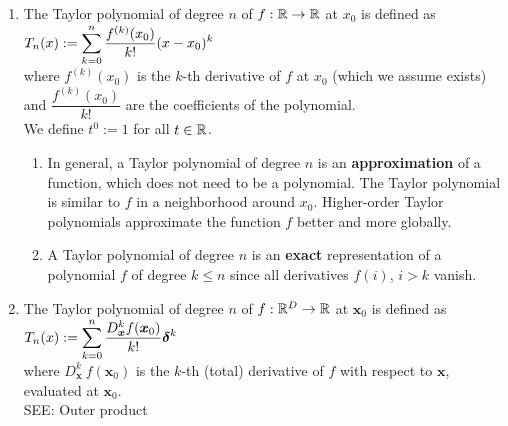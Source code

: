 \begin{enumerate}
    \item 
    \begin{definition}
        The Taylor polynomial of degree $n$ of $f : \mathbb{R} \to \mathbb{R}$ at $x_0$ is defined as
        $
            T_n(x)
            := \displaystyle\sum_{k=0}^n \dfrac{f^{(k)}(x_0)}{k!} (x - x_0)^k
        $
        \hfill \cite{mfml/book/mml/Deisenroth-Faisal-Ong}
        \\
        where $f ^{(k)}(x_0)$ is the $k$-th derivative of $f$ at $x_0$ (which we assume exists) and $\dfrac{f ^{(k)}(x_0)}{ k!}$ are the coefficients of the polynomial.
        \hfill \cite{mfml/book/mml/Deisenroth-Faisal-Ong}
        \\
        We define $t^0 := 1$ for all $t \in \mathbb{R}$.
        \hfill \cite{mfml/book/mml/Deisenroth-Faisal-Ong}
    \end{definition}
    \begin{enumerate}
        \item In general, a Taylor polynomial of degree $n$ is an \textbf{approximation} of a function, which does not need to be a polynomial. 
        The Taylor polynomial is similar to $f$ in a neighborhood around $x_0$. 
        Higher-order Taylor polynomials approximate the function $f$ better and more globally.
        \hfill \cite{mfml/book/mml/Deisenroth-Faisal-Ong}
        
        \item A Taylor polynomial of degree $n$ is an \textbf{exact} representation of a polynomial $f$ of degree $k \leq n$ since all derivatives $f (i)$, $i > k$ vanish. 
        \hfill \cite{mfml/book/mml/Deisenroth-Faisal-Ong}
    \end{enumerate}

    \item 
    \begin{definition}
        The Taylor polynomial of degree $n$ of $f : \mathbb{R}^D \to \mathbb{R}$ at $\bm{x}_0$ is defined as
        $
            T_n(x)
            := \displaystyle\sum_{k=0}^n \dfrac{D^k_{\bm{x}} f(\bm{x}_0)}{k!} \bm{\delta}^k
        $
        \hfill \cite{mfml/book/mml/Deisenroth-Faisal-Ong}
        \\
        where $D^k _{\bm{x}}\ f (\bm{x}_0)$ is the $k$-th (total) derivative of $f$ with respect to $\bm{x}$, evaluated at $\bm{x}_0$.
        \\
        SEE: Outer product
        \hfill \cite{mfml/book/mml/Deisenroth-Faisal-Ong}
    \end{definition}
\end{enumerate}

















